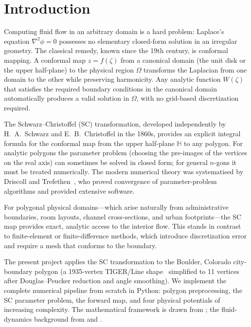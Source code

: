 \documentclass[11pt]{article}
\newcommand{\HH}{\mathbb{H}}          %
\begin{document}
\newpage

\section{Introduction}

Computing fluid flow in an arbitrary domain is a hard problem: Laplace's equation
$\nabla^2\phi=0$ possesses no elementary closed-form solution in an irregular
geometry. The classical remedy, known since the 19th century, is conformal mapping.
A conformal map $z = f(\zeta)$ from a canonical domain (the unit disk or the upper
half-plane) to the physical region $\Omega$ transforms the Laplacian from one domain
to the other while preserving harmonicity. Any analytic function $W(\zeta)$ that
satisfies the required boundary conditions in the canonical domain automatically
produces a valid solution in $\Omega$, with no grid-based discretization required.

The Schwarz--Christoffel (SC) transformation, developed independently by
H.~A.~Schwarz and E.~B.~Christoffel in the 1860s, provides an explicit integral
formula for the conformal map from the upper half-plane $\HH$ to any polygon.
For analytic polygons the parameter problem (choosing the pre-images of the
vertices on the real axis) can sometimes be solved in closed form; for general
$n$-gons it must be treated numerically. The modern numerical theory was
systematised by Driscoll and Trefethen~\citep{DT09}, who proved convergence of
parameter-problem algorithms and provided extensive software.

For polygonal physical domains---which arise naturally from administrative
boundaries, room layouts, channel cross-sections, and urban footprints---the
SC map provides exact, analytic access to the interior flow. This stands in
contrast to finite-element or finite-difference methods, which introduce
discretization error and require a mesh that conforms to the boundary.

The present project applies the SC transformation to the Boulder, Colorado
city-boundary polygon (a 1935-vertex TIGER/Line shape~\citep{TIGER25} simplified
to 11 vertices after Douglas--Peucker reduction and angle smoothing). We implement
the complete numerical pipeline from scratch in Python: polygon preprocessing,
the SC parameter problem, the forward map, and four physical potentials of
increasing complexity. The mathematical framework is drawn from
\citet{AF03,DT09}; the fluid-dynamics background from \citet{BO99} and
\citet{MT68}.
\end{document}
